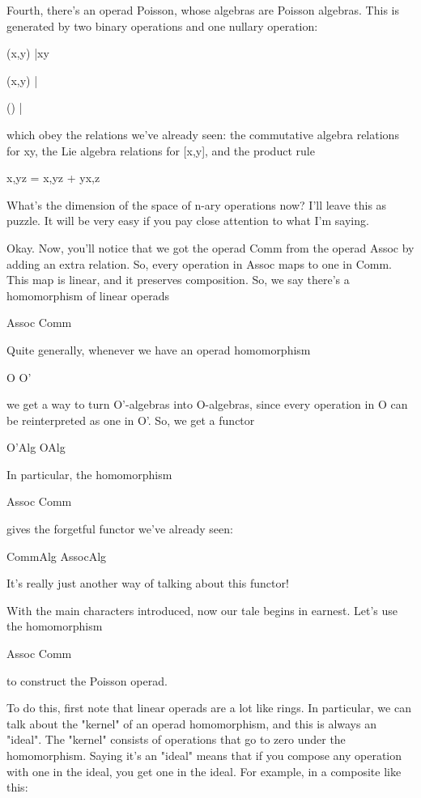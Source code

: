 Fourth, there's an operad Poisson, whose algebras are Poisson
algebras.  This is generated by two binary operations and one nullary
operation:

(x,y) |\to  xy

(x,y) |

() |

which obey the relations we've already seen: the commutative algebra
relations for xy, the Lie algebra relations for [x,y], and the product
rule

{x,yz} = {x,y}z + y{x,z}

What's the dimension of the space of n-ary operations now?  I'll leave
this as puzzle.  It will be very easy if you pay close attention to
what I'm saying.

Okay.  Now, you'll notice that we got the operad Comm from the operad
Assoc by adding an extra relation.  So, every operation in Assoc maps
to one in Comm.  This map is linear, and it preserves composition.
So, we say there's a homomorphism of linear operads

Assoc \to  Comm

Quite generally, whenever we have an operad homomorphism 

O \to  O'

we get a way to turn O'-algebras into O-algebras, since every
operation in O can be reinterpreted as one in O'.  So, we get a
functor

O'Alg \to  OAlg

In particular, the homomorphism

Assoc \to  Comm

gives the forgetful functor we've already seen:

CommAlg \to  AssocAlg

It's really just another way of talking about this functor!

With the main characters introduced, now our tale begins in earnest.
Let's use the homomorphism

Assoc \to  Comm 

to construct the Poisson operad.

To do this, first note that linear operads are a lot like rings.  In
particular, we can talk about the "kernel" of an operad
homomorphism, and this is always an "ideal".  The
"kernel" consists of operations that go to zero under the
homomorphism.  Saying it's an "ideal" means that if you
compose any operation with one in the ideal, you get one in the ideal.
For example, in a composite like this:

